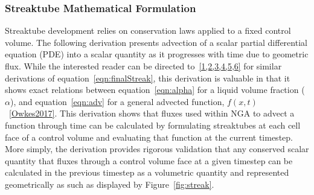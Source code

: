 \subsubsection{Streaktube Mathematical Formulation}
Streaktube development relies on conservation laws applied to a fixed control volume. The following derivation presents advection of a scalar partial differential equation (PDE) into a scalar quantity as it progresses with time due to geometric flux. While the interested reader can be directed to~\ref{1,2,3,4,5,6}  for similar derivations of equation~\ref{eqn:finalStreak}, this derivation is valuable in that it shows exact relations between equation~\ref{eqn:alpha} for a liquid volume fraction ($\alpha$), and equation~\ref{eqn:adv} for a general advected function, $f(x,t)$~\ref{Owkes2017}. This derivation shows that fluxes used within NGA to advect a function through time can be calculated by formulating streaktubes at each cell face of a control volume and evaluating that function at the current timestep. More simply, the derivation provides rigorous validation that any conserved scalar quantity that fluxes through a control volume face at a given timestep can be calculated in the previous timestep as a volumetric quantity and represented geometrically as such as displayed by Figure~\ref{fig:streak}.  

